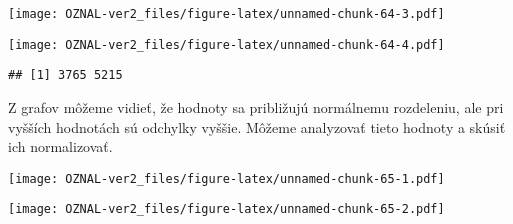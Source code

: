 \documentclass[
]{article}
\newenvironment{Shaded}{\begin{snugshade}}{\end{snugshade}}
\newcommand{\AttributeTok}[1]{\textcolor[rgb]{0.77,0.63,0.00}{#1}}
\newcommand{\FunctionTok}[1]{\textcolor[rgb]{0.00,0.00,0.00}{#1}}
\newcommand{\NormalTok}[1]{#1}
\newcommand{\SpecialCharTok}[1]{\textcolor[rgb]{0.00,0.00,0.00}{#1}}
\newcommand{\StringTok}[1]{\textcolor[rgb]{0.31,0.60,0.02}{#1}}
\begin{document}
\texttt{[image: OZNAL-ver2\_files/figure-latex/unnamed-chunk-64-3.pdf]}

\begin{Shaded}
\end{Shaded}

\texttt{[image: OZNAL-ver2\_files/figure-latex/unnamed-chunk-64-4.pdf]}

\begin{verbatim}
## [1] 3765 5215
\end{verbatim}

Z grafov môžeme vidieť, že hodnoty sa približujú normálnemu rozdeleniu,
ale pri vyšších hodnotách sú odchylky vyššie. Môžeme analyzovať tieto
hodnoty a skúsiť ich normalizovať.

\begin{Shaded}
\end{Shaded}

\texttt{[image: OZNAL-ver2\_files/figure-latex/unnamed-chunk-65-1.pdf]}

\begin{Shaded}
\end{Shaded}

\texttt{[image: OZNAL-ver2\_files/figure-latex/unnamed-chunk-65-2.pdf]}

\begin{Shaded}
\end{Shaded}
\end{document}
